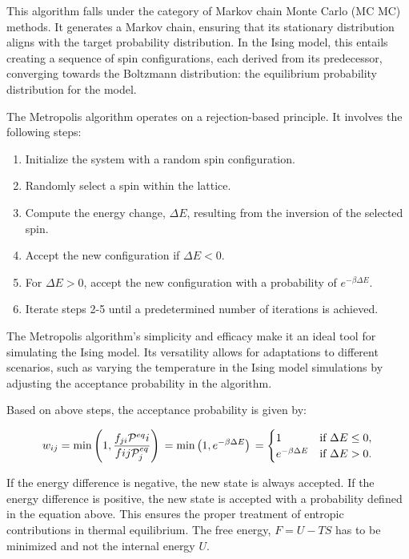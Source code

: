 This algorithm falls under the category of Markov chain Monte Carlo (MC MC)
methods. It generates a Markov chain, ensuring that its stationary distribution
aligns with the target probability distribution. In the Ising model, this
entails creating a sequence of spin configurations, each derived from its
predecessor, converging towards the Boltzmann distribution: the equilibrium
probability distribution for the model.

The Metropolis algorithm operates on a rejection-based principle. It involves
the following steps:

\begin{enumerate}
\item Initialize the system with a random spin configuration.
\item Randomly select a spin within the lattice.
\item Compute the energy change, $\Delta E$, resulting from the inversion of the
selected spin.
\item Accept the new configuration if $\Delta E < 0$.
\item For $\Delta E > 0$, accept the new configuration with a probability of
$e^{-\beta \Delta E}$.
\item Iterate steps 2-5 until a predetermined number of iterations is achieved.
\end{enumerate}

The Metropolis algorithm's simplicity and efficacy make it an ideal tool for
simulating the Ising model. Its versatility allows for adaptations to different
scenarios, such as varying the temperature in the Ising model simulations by
adjusting the acceptance probability in the algorithm.

Based on above steps, the acceptance probability is given by:

\begin{equation}
    w_{ij} = \min \left( 1, \frac{f_{ji} \mathcal{P}^{eq}i}{f{ij} \mathcal{P}^{eq}_j} \right) \\
    = \min \left( 1, e^{-\beta \Delta E} \right) \\
    =
    \begin{cases}
        1 & \text{if } \Delta E \leq 0, \\
        e^{-\beta \Delta E} & \text{if } \Delta E > 0.
    \end{cases}
    \end{equation}

If the energy difference is negative, the new state is always accepted. If the
energy difference is positive, the new state is accepted with a probability
defined in the equation above. This ensures the proper treatment of entropic
contributions in thermal equilibrium. The free energy, $F = U -TS $ has to be
minimized and not the internal energy $U$.

